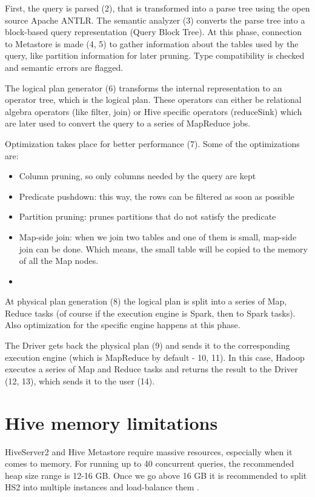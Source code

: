 First, the query is parsed (2), that is transformed into a parse tree using the open source Apache ANTLR.  The semantic analyzer (3) converts the parse tree into a block-based query representation (Query Block Tree). At this phase, connection to Metastore is made (4, 5) to gather information about the tables used by the query, like partition information for later pruning. Type compatibility is checked and semantic errors are flagged.

The logical plan generator (6) transforms the internal representation to an operator tree, which is the logical plan. These operators can either be relational algebra operators (like filter, join) or Hive specific operators (\eg reduceSink) which are later used to convert the query to a series of MapReduce jobs.

Optimization takes place for better performance (7). Some of the optimizations are: 
\begin{itemize}
	\item Column pruning, so only columns needed by the query are kept
	\item Predicate pushdown: this way, the rows can be filtered as soon as possible
	\item Partition pruning: prunes partitions that do not satisfy the predicate
	\item Map-side join: when we join two tables and one of them is small, map-side join can be done. Which means, the small table will be copied to the memory of all the Map nodes.
	\item \etc
\end{itemize}

At physical plan generation (8) the logical plan is split into a series of Map, Reduce tasks (of course if the execution engine is Spark, then to Spark tasks). Also optimization for the specific engine happens at this phase. 

The Driver gets back the physical plan (9) and sends it to the corresponding execution engine (which is MapReduce by default - 10, 11). In this case, Hadoop executes a series of Map and Reduce tasks and returns the result to the Driver (12, 13), which sends it to the user (14).

\section{Hive memory limitations}
HiveServer2 and Hive Metastore require massive resources, especially when it comes to memory. For running up to 40 concurrent queries, the recommended heap size range is 12-16 GB. Once we go above 16 GB it is recommended to split HS2 into multiple instances and load-balance them \cite{Hive-memory-problems}.

